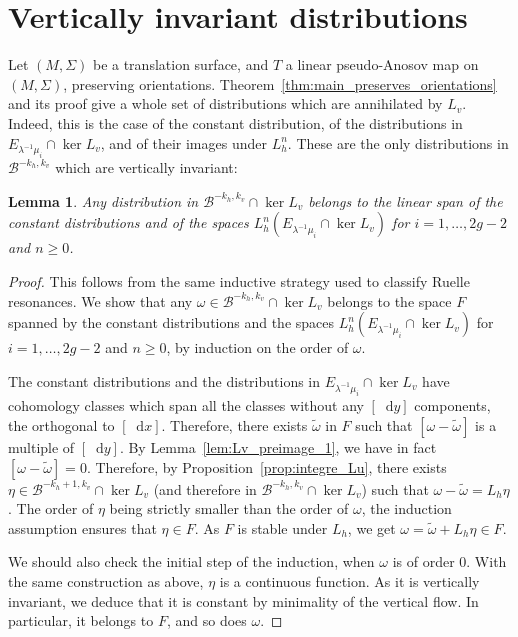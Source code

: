 \documentclass[10pt]{amsart}
\newcommand{\boB}{\mathcal{B}}
\newcommand{\dd}{\mathop{}\!\mathrm{d}}
\newtheorem{lem}[thm]{Lemma}
\theoremstyle{definition}
\numberwithin{equation}{section}
\begin{document}
\section{Vertically invariant distributions}
\label{sec:vertically_invariant}

Let $(M,\Sigma)$ be a translation surface, and $T$ a linear pseudo-Anosov map
on $(M,\Sigma)$, preserving orientations.
Theorem~\ref{thm:main_preserves_orientations} and its proof give a whole set
of distributions which are annihilated by $L_v$. Indeed, this is the case of
the constant distribution, of the distributions in $E_{\lambda^{-1}\mu_i}
\cap \ker L_v$, and of their images under $L_h^n$. These are the only
distributions in $\boB^{-k_h, k_v}$ which are vertically invariant:

\begin{lem}
\label{lem:Lv_invariant_boB} Any distribution in $\boB^{-k_h, k_v} \cap \ker
L_v$ belongs to the linear span of the constant distributions and of the
spaces $L_h^n(E_{\lambda^{-1}\mu_i} \cap \ker L_v)$ for $i=1,\dotsc, 2g-2$
and $n\geq 0$.
\end{lem}
\begin{proof}
This follows from the same inductive strategy used to classify Ruelle
resonances. We show that any $\omega \in \boB^{-k_h, k_v} \cap \ker L_v$
belongs to the space $F$ spanned by the constant distributions and the spaces
$L_h^n(E_{\lambda^{-1}\mu_i} \cap \ker L_v)$ for $i=1,\dotsc, 2g-2$ and
$n\geq 0$, by induction on the order of $\omega$.

The constant distributions and the distributions in $E_{\lambda^{-1}\mu_i}
\cap \ker L_v$ have cohomology classes which span all the classes without any
$[\dd y]$ components, \ie the orthogonal to $[\dd x]$. Therefore, there
exists $\tilde \omega$ in $F$ such that $[\omega - \tilde \omega]$ is a
multiple of $[\dd y]$. By Lemma~\ref{lem:Lv_preimage_1}, we have in fact
$[\omega - \tilde \omega] = 0$. Therefore, by
Proposition~\ref{prop:integre_Lu}, there exists $\eta \in \boB^{-k_h+1, k_v}
\cap \ker L_v$ (and therefore in $\boB^{-k_h, k_v} \cap \ker L_v$) such that
$\omega-\tilde \omega = L_h \eta$. The order of $\eta$ being strictly smaller
than the order of $\omega$, the induction assumption ensures that $\eta \in
F$. As $F$ is stable under $L_h$, we get $\omega = \tilde \omega + L_h \eta
\in F$.

We should also check the initial step of the induction, when $\omega$ is of
order $0$. With the same construction as above, $\eta$ is a continuous
function. As it is vertically invariant, we deduce that it is constant by
minimality of the vertical flow. In particular, it belongs to $F$, and so
does $\omega$.
\end{proof}
\end{document}
